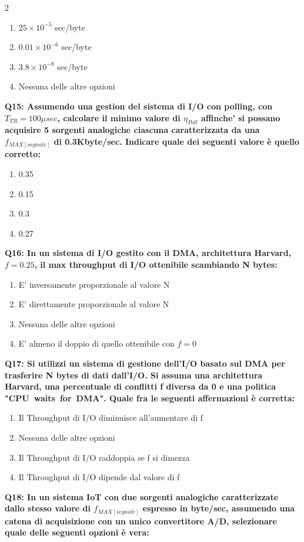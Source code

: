 \documentclass[10pt]{article}
\begin{document}
\begin{multicols}{2}
\begin{enumerate}[label=\arabic*.]
\item $25\times10^{-5}$ sec/byte
\item $0.01\times10^{-6}$ sec/byte
\item $3.8\times10^{-8}$ sec/byte
\item Nessuna delle altre opzioni
\end{enumerate}
\textbf{Q15: Assumendo una gestion del sistema di I/O con polling, con $T_{TR}=100\mu sec$, calcolare il minimo valore di $\eta_{Poll}$ affinche' si possano acquisire 5 sorgenti analogiche ciascuna caratterizzata da una $f_{MAX[segnale]}$ di 0.3Kbyte/sec.  Indicare quale dei seguenti valore è quello corretto:}

\begin{enumerate}[label=\arabic*.]
\item 0.35
\item 0.15
\item 0.3
\item 0.27
\end{enumerate}
\textbf{Q16: In un sistema di I/O gestito con il DMA, architettura Harvard, $f=0.25$, il max throughput di I/O ottenibile scambiando N bytes:}

\begin{enumerate}[label=\arabic*.]
\item E' inversamente proporzionale al valore N
\item E' direttamente proporzionale al valore N
\item Nessuna delle altre opzioni
\item E' almeno il doppio di quello ottenibile con $f=0$
\end{enumerate}
\textbf{Q17: Si utilizzi un sistema di gestione dell’I/O basato sul DMA per trasferire N bytes di dati dall’I/O. Si assuma una architettura Harvard, una percentuale di conflitti f diversa da 0 e una politica "CPU waits for DMA". Quale fra le seguenti affermazioni è corretta:}

\begin{enumerate}[label=\arabic*.]
\item Il Throughput di I/O diminuisce all’aumentare di f
\item Nessuna delle altre opzioni
\item Il Throughput di I/O raddoppia se f si dimezza
\item Il Throughput di I/O dipende dal valore di f
\end{enumerate}
\textbf{Q18: In un sistema IoT con due sorgenti analogiche caratterizzate dallo stesso valore di $f_{MAX[segnale]}$ espresso in byte/sec, assumendo una catena di acquisizione con un unico convertitore A/D, selezionare quale delle seguenti opzioni è vera:}


\end{multicols}
\end{document}
